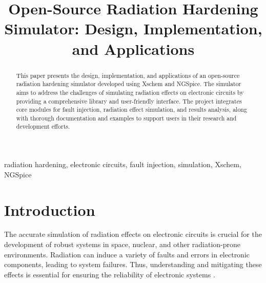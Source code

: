 \documentclass[conference]{IEEEtran}
\begin{document}
\title{Open-Source Radiation Hardening Simulator: Design, Implementation, and Applications}

\author{
\and
{}
\and
{}
\and
{}
}

\maketitle

\begin{abstract}
This paper presents the design, implementation, and applications of an open-source radiation hardening simulator developed using Xschem and NGSpice. The simulator aims to address the challenges of simulating radiation effects on electronic circuits by providing a comprehensive library and user-friendly interface. The project integrates core modules for fault injection, radiation effect simulation, and results analysis, along with thorough documentation and examples to support users in their research and development efforts.
\end{abstract}

\begin{IEEEkeywords}
radiation hardening, electronic circuits, fault injection, simulation, Xschem, NGSpice
\end{IEEEkeywords}

\section{Introduction}
The accurate simulation of radiation effects on electronic circuits is crucial for the development of robust systems in space, nuclear, and other radiation-prone environments. Radiation can induce a variety of faults and errors in electronic components, leading to system failures. Thus, understanding and mitigating these effects is essential for ensuring the reliability of electronic systems \cite{Wrobel2011, Florian1986}.
\end{document}
